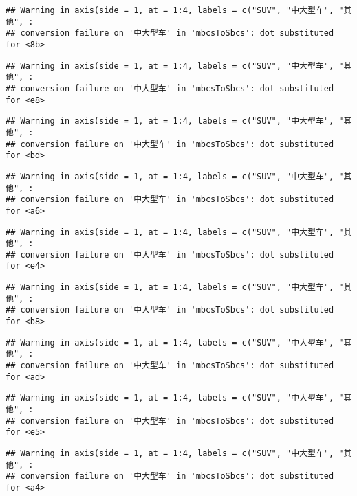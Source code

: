 \documentclass[]{article}
\begin{document}
\begin{verbatim}
## Warning in axis(side = 1, at = 1:4, labels = c("SUV", "中大型车", "其他", :
## conversion failure on '中大型车' in 'mbcsToSbcs': dot substituted for <8b>
\end{verbatim}

\begin{verbatim}
## Warning in axis(side = 1, at = 1:4, labels = c("SUV", "中大型车", "其他", :
## conversion failure on '中大型车' in 'mbcsToSbcs': dot substituted for <e8>
\end{verbatim}

\begin{verbatim}
## Warning in axis(side = 1, at = 1:4, labels = c("SUV", "中大型车", "其他", :
## conversion failure on '中大型车' in 'mbcsToSbcs': dot substituted for <bd>
\end{verbatim}

\begin{verbatim}
## Warning in axis(side = 1, at = 1:4, labels = c("SUV", "中大型车", "其他", :
## conversion failure on '中大型车' in 'mbcsToSbcs': dot substituted for <a6>
\end{verbatim}

\begin{verbatim}
## Warning in axis(side = 1, at = 1:4, labels = c("SUV", "中大型车", "其他", :
## conversion failure on '中大型车' in 'mbcsToSbcs': dot substituted for <e4>
\end{verbatim}

\begin{verbatim}
## Warning in axis(side = 1, at = 1:4, labels = c("SUV", "中大型车", "其他", :
## conversion failure on '中大型车' in 'mbcsToSbcs': dot substituted for <b8>
\end{verbatim}

\begin{verbatim}
## Warning in axis(side = 1, at = 1:4, labels = c("SUV", "中大型车", "其他", :
## conversion failure on '中大型车' in 'mbcsToSbcs': dot substituted for <ad>
\end{verbatim}

\begin{verbatim}
## Warning in axis(side = 1, at = 1:4, labels = c("SUV", "中大型车", "其他", :
## conversion failure on '中大型车' in 'mbcsToSbcs': dot substituted for <e5>
\end{verbatim}

\begin{verbatim}
## Warning in axis(side = 1, at = 1:4, labels = c("SUV", "中大型车", "其他", :
## conversion failure on '中大型车' in 'mbcsToSbcs': dot substituted for <a4>
\end{verbatim}
\end{document}
